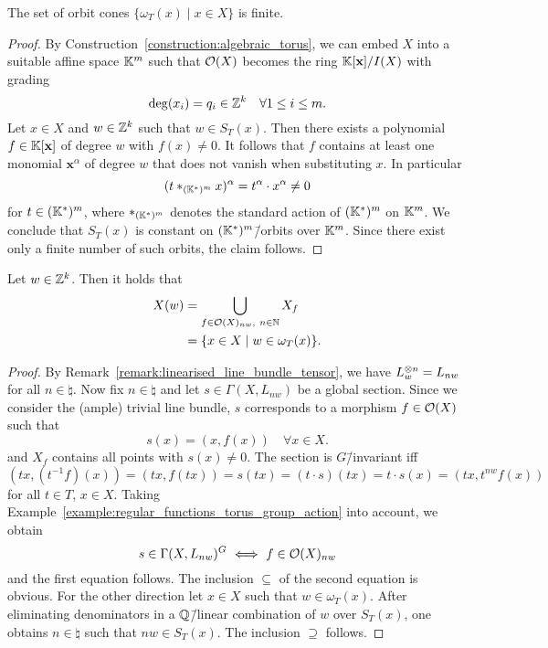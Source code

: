 \begin{prop}
	\label{prop:finite_orbit_cones}
	The set of orbit cones $\{\omega_T(x)\mid x\in X\}$ is finite.
\end{prop}
\begin{proof}
	By Construction~\ref{construction:algebraic_torus}, we can embed $X$ into a suitable affine space $\mathbb{K}^m$ such that $\mathcal{O}(X)$ becomes the ring $\mathbb{K}[\mathbf{x}]/I(X)$ with grading
	$$\deg(x_i) = q_i\in\mathbb{Z}^k\quad\forall 1\leq i \leq m.$$
	Let $x\in X$ and $w\in\mathbb{Z}^k$ such that $w\in S_T(x)$. Then there exists a polynomial $f\in\mathbb{K}[\mathbf{x}]$ of degree $w$ with $f(x)\neq 0$. It follows that $f$ contains at least one monomial $\mathbf{x}^\alpha$ of degree $w$ that does not vanish when substituting $x$. In particular
	$$(t *_{(\mathbb{K}^*)^m} x)^\alpha = t^\alpha \cdot x^\alpha \neq 0$$
	for $t\in(\mathbb{K}^*)^m$, where $*_{(\mathbb{K}^*)^m}$ denotes the standard action of $(\mathbb{K}^*)^m$ on $\mathbb{K}^m$. We conclude that $S_T(x)$ is constant on $(\mathbb{K}^*)^m$\=/orbits over $\mathbb{K}^m$. Since there exist only a finite number of such orbits, the claim follows.
\end{proof}

\begin{lemma} Let $w\in\mathbb{Z}^k$. Then it holds that
	\label{lemma:semistable_points_determined_by_orbit_cones}
	\begin{align*}
	X(w) 
	&= \bigcup_{f\in\mathcal{O}(X)_{nw},\ n\in\mathbb{N}} X_f\\
	&= \{x\in X\mid w\in\omega_T(x)\}.
	\end{align*}
\end{lemma}
\begin{proof}
	By Remark~\ref{remark:linearised_line_bundle_tensor}, we have $L_w^{\otimes n} = L_{nw}$ for all $n\in\natural$. Now fix $n\in\natural$ and let $s\in\Gamma(X,L_{nw})$ be a global section. Since we consider the (ample) trivial line bundle, $s$ corresponds to a morphism $f\in\mathcal{O}(X)$ such that
	$$s(x) = (x, f(x))\quad \forall x\in X.$$
	and $X_f$ contains all points with $s(x) \neq 0$. The section is $G$\=/invariant iff
	$$(tx, (t^{-1}f)(x)) = (tx, f(tx)) = s(tx) = (t\cdot s)(tx) = t\cdot s(x) = (tx, t^{nw} f(x))$$
	for all $t\in T$, $x\in X$. Taking Example~\ref{example:regular_functions_torus_group_action} into account, we obtain
	$$s\in\Gamma(X,L_{nw})^G \ \Longleftrightarrow\ f\in\O(X)_{nw}$$
	and the first equation follows. The inclusion $\subseteq$ of the second equation is obvious. For the other direction let $x\in X$ such that $w\in\omega_T(x)$. After eliminating denominators in a $\mathbb{Q}$\=/linear combination of $w$ over $S_T(x)$, one obtains $n\in\natural$ such that $nw \in S_T(x)$. The inclusion $\supseteq$ follows.
\end{proof}

